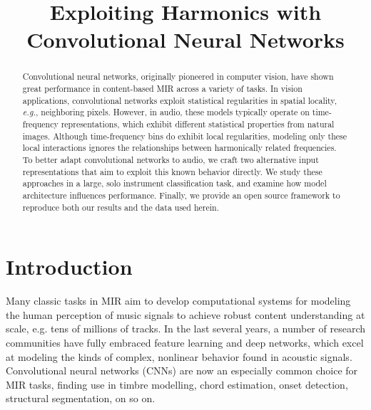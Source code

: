 \documentclass{article}
\title{Exploiting Harmonics with Convolutional Neural Networks}
\begin{document}
%
\maketitle
%
\begin{abstract}

Convolutional neural networks, originally pioneered in computer vision, have shown great performance in content-based MIR across a variety of tasks.
In vision applications, convolutional networks exploit statistical regularities in spatial locality, \emph{e.g.}, neighboring pixels.
However, in audio, these models typically operate on time-frequency representations, which exhibit different statistical properties from natural images.
Although time-frequency bins do exhibit local regularities, modeling only these local interactions ignores the relationships between harmonically related frequencies.
To better adapt convolutional networks to audio, we craft two alternative input representations that aim to exploit this known behavior directly.
We study these approaches in a large, solo instrument classification task, and examine how model architecture influences performance.
Finally, we provide an open source framework to reproduce both our results and the data used herein.

\end{abstract}


\section{Introduction}\label{sec:introduction}

Many classic tasks in MIR aim to develop computational systems for modeling the human perception of music signals to achieve robust content understanding at scale, e.g. tens of millions of tracks.
In the last several years, a number of research communities have fully embraced feature learning and deep networks, which excel at modeling the kinds of complex, nonlinear behavior found in acoustic signals.
Convolutional neural networks (CNNs) are now an especially common choice for MIR tasks, finding use in timbre modelling, chord estimation, onset detection, structural segmentation, on so on.
\end{document}
